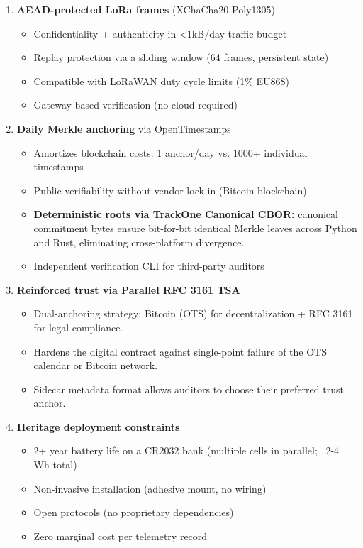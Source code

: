 \begin{enumerate}[nosep]
    \item \textbf{AEAD-protected LoRa frames} (XChaCha20-Poly1305)
    \begin{itemize}[nosep]
        \item Confidentiality + authenticity in <1kB/day traffic budget
        \item Replay protection via a sliding window (64 frames, persistent state)
        \item Compatible with \ac{LoRa}WAN duty cycle limits (1\% EU868)
        \item Gateway-based verification (no cloud required)
    \end{itemize}

    \item \textbf{Daily Merkle anchoring} via OpenTimestamps
    \begin{itemize}[nosep]
        \item Amortizes blockchain costs: 1 anchor/day vs.
        1000+ individual timestamps
        \item Public verifiability without vendor lock-in (Bitcoin blockchain)
        \item \textbf{Deterministic roots via TrackOne Canonical CBOR:} canonical commitment bytes ensure bit-for-bit identical Merkle leaves across Python and Rust, eliminating cross-platform divergence.
        \item Independent verification \ac{CLI} for third-party auditors
    \end{itemize}

    \item \textbf{Reinforced trust via Parallel RFC 3161 TSA}
    \begin{itemize}[nosep]
        \item Dual-anchoring strategy: Bitcoin (\ac{OTS}) for decentralization + \ac{RFC} 3161 for legal compliance.
        \item Hardens the digital contract against single-point failure of the \ac{OTS} calendar or Bitcoin network.
        \item Sidecar metadata format allows auditors to choose their preferred trust anchor.
    \end{itemize}

    \item \textbf{Heritage deployment constraints}
    \begin{itemize}[nosep]
        \item 2+ year battery life on a CR2032 bank (multiple cells in parallel; ~2-4 Wh total)
        \item Non-invasive installation (adhesive mount, no wiring)
        \item Open protocols (no proprietary dependencies)
        \item Zero marginal cost per telemetry record
    \end{itemize}


\end{enumerate}
